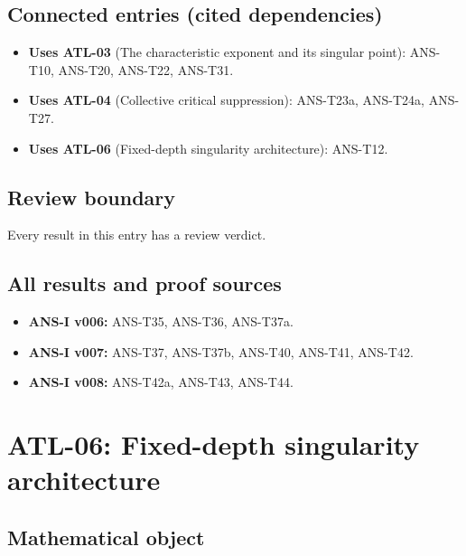 \documentclass[
  11pt,
]{article}
\providecommand{\tightlist}{%
  \setlength{\itemsep}{0pt}\setlength{\parskip}{0pt}}
\begin{document}
\hypertarget{connected-entries-cited-dependencies-4}{%
\subsection{Connected entries (cited
dependencies)}\label{connected-entries-cited-dependencies-4}}

\begin{itemize}
\tightlist
\item
  \textbf{Uses ATL-03} (The characteristic exponent and its singular
  point): ANS-T10, ANS-T20, ANS-T22, ANS-T31.
\item
  \textbf{Uses ATL-04} (Collective critical suppression): ANS-T23a,
  ANS-T24a, ANS-T27.
\item
  \textbf{Uses ATL-06} (Fixed-depth singularity architecture): ANS-T12.
\end{itemize}

\hypertarget{review-boundary-4}{%
\subsection{Review boundary}\label{review-boundary-4}}

Every result in this entry has a review verdict.

\hypertarget{all-results-and-proof-sources-4}{%
\subsection{All results and proof
sources}\label{all-results-and-proof-sources-4}}

\begin{itemize}
\tightlist
\item
  \textbf{ANS-I v006:} ANS-T35, ANS-T36, ANS-T37a.
\item
  \textbf{ANS-I v007:} ANS-T37, ANS-T37b, ANS-T40, ANS-T41, ANS-T42.
\item
  \textbf{ANS-I v008:} ANS-T42a, ANS-T43, ANS-T44.
\end{itemize}

\hypertarget{atl-06-fixed-depth-singularity-architecture}{%
\section{ATL-06: Fixed-depth singularity
architecture}\label{atl-06-fixed-depth-singularity-architecture}}

\hypertarget{mathematical-object-5}{%
\subsection{Mathematical object}\label{mathematical-object-5}}
\end{document}
